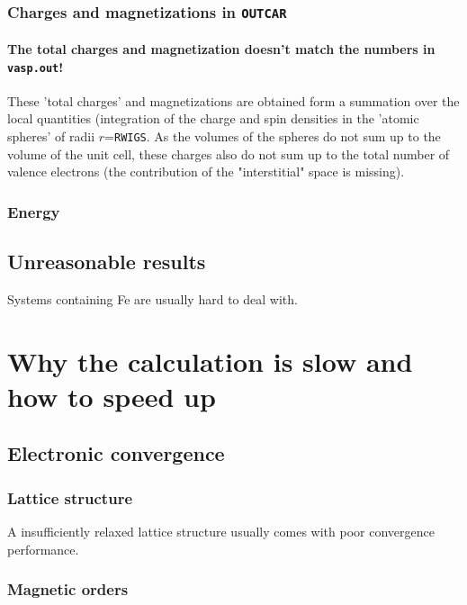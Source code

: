 \documentclass[hyperref, a4paper]{article}
\begin{document}
\subsubsection{Charges and magnetizations in \texttt{OUTCAR}}

\paragraph{The total charges and magnetization doesn't match the numbers in \texttt{vasp.out}!}

These 'total charges' and magnetizations are obtained form a summation over the local quantities (integration of the charge and spin densities in the 'atomic spheres' of radii $r$=\texttt{RWIGS}. 
As the volumes of the spheres do not sum up to the volume of the unit cell, these charges also do not sum up to the total number of valence electrons (the contribution of the "interstitial" space is missing).

\subsubsection{Energy}

\subsection{Unreasonable results}

Systems containing Fe are usually hard to deal with.

\section{Why the calculation is slow and how to speed up}

\subsection{Electronic convergence}

\subsubsection{Lattice structure}

A insufficiently relaxed lattice structure usually comes with poor convergence performance.

\subsubsection{Magnetic orders}
\end{document}
